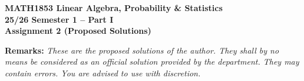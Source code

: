 \documentclass[answers]{exam}
\begin{document}
\begin{center}
    \textbf
    {\Large{MATH1853 Linear Algebra, Probability \& Statistics} \\
    \large{25/26 Semester 1 -- Part I} \\
    \large{Assignment 2 (Proposed Solutions)}}
\end{center}

\textbf{Remarks: }{
    \itshape
    These are the proposed solutions of the author. They shall by no means be considered as an
    official solution provided by the department. They may contain errors. You are advised to
    use with discretion.
}

\begin{questions}
    
    

    

    

    

    

\end{questions}
\end{document}
